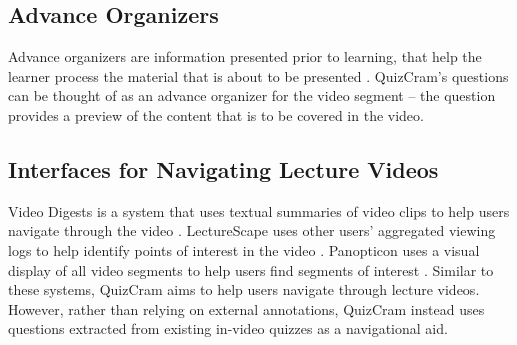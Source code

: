 \documentclass{sigchi}
\begin{document}


\subsection{Advance Organizers}

Advance organizers are information presented prior to learning, that help the learner process the material that is about to be presented  \cite{advanceorganizers}. QuizCram's questions can be thought of as an advance organizer for the video segment -- the question provides a preview of the content that is to be covered in the video. %

\subsection{Interfaces for Navigating Lecture Videos}

Video Digests is a system that uses textual summaries of video clips to help users navigate through the video \cite{videodigests}. LectureScape uses other users' aggregated viewing logs to help identify points of interest in the video \cite{lecturescape}. Panopticon uses a visual display of all video segments to help users find segments of interest \cite{panopticon}. Similar to these systems, QuizCram aims to help users navigate through lecture videos. However, rather than relying on external annotations, QuizCram instead uses questions extracted from existing in-video quizzes as a navigational aid. %
\end{document}
